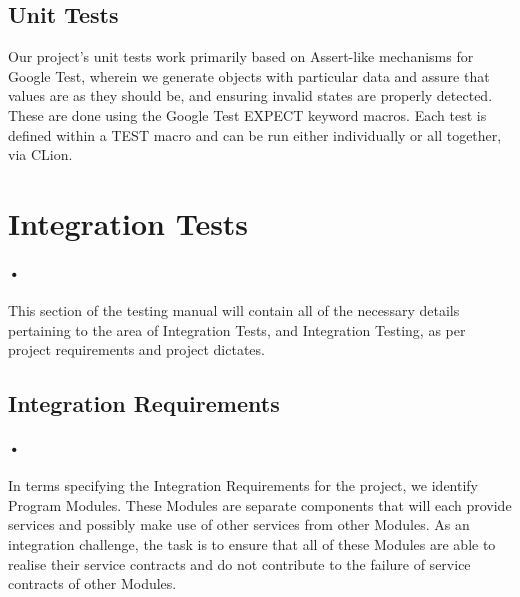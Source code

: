 \documentclass[11pt]{article}
\begin{document}
\subsection{Unit Tests}
Our project's unit tests work primarily based on Assert-like mechanisms for Google Test, wherein we generate objects with particular data and assure that values are as they should be, and ensuring invalid states are properly detected. These are done using the Google Test EXPECT keyword macros.
\newline Each test is defined within a TEST macro and can be run either individually or all together, via CLion. 


\section{Integration Tests}
\paragraph{•}
This section of the testing manual will contain all of the necessary details pertaining to the area of Integration Tests, and Integration Testing, as per project requirements and project dictates.
\subsection{Integration Requirements}
\paragraph{•}
In terms specifying the Integration Requirements for the project, we identify Program Modules. These Modules are separate components that will each provide services and possibly make use of other services from other Modules. As an integration challenge, the task is to ensure that all of these Modules are able to realise their service contracts and do not contribute to the failure of service contracts of other Modules.
\end{document}
